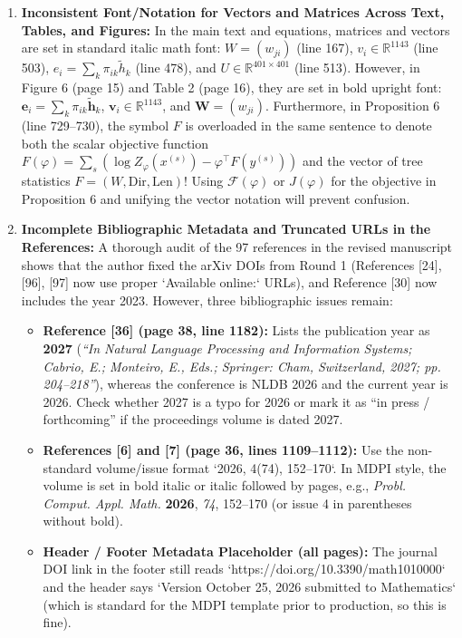 \documentclass[11pt,a4paper]{article}
\begin{document}
\begin{enumerate}[label=\textbf{Issue \arabic*:}, resume, wide, labelwidth=!, labelindent=0pt]
    \item \textbf{Inconsistent Font/Notation for Vectors and Matrices Across Text, Tables, and Figures:}
    In the main text and equations, matrices and vectors are set in standard italic math font: $W = (w_{ji})$ (line 167), $v_i \in \mathbb{R}^{1143}$ (line 503), $e_i = \sum_k \pi_{ik}\tilde{h}_k$ (line 478), and $U \in \mathbb{R}^{401\times 401}$ (line 513). However, in Figure 6 (page 15) and Table 2 (page 16), they are set in bold upright font: $\mathbf{e}_i = \sum_k \pi_{ik}\tilde{\mathbf{h}}_k$, $\mathbf{v}_i \in \mathbb{R}^{1143}$, and $\mathbf{W} = (w_{ji})$. Furthermore, in Proposition 6 (line 729--730), the symbol $F$ is overloaded in the same sentence to denote both the scalar objective function $F(\varphi) = \sum_s (\log Z_\varphi(x^{(s)}) - \varphi^\top F(y^{(s)}))$ and the vector of tree statistics $F = (W, \mathrm{Dir}, \mathrm{Len})$! Using $\mathcal{F}(\varphi)$ or $J(\varphi)$ for the objective in Proposition 6 and unifying the vector notation will prevent confusion.

    \item \textbf{Incomplete Bibliographic Metadata and Truncated URLs in the References:}
    A thorough audit of the 97 references in the revised manuscript shows that the author fixed the arXiv DOIs from Round 1 (References [24], [96], [97] now use proper `Available online:` URLs), and Reference [30] now includes the year 2023. However, three bibliographic issues remain:
    \begin{itemize}
        \item \textbf{Reference [36] (page 38, line 1182):} Lists the publication year as \textbf{2027} (\textit{``In Natural Language Processing and Information Systems; Cabrio, E.; Monteiro, E., Eds.; Springer: Cham, Switzerland, 2027; pp. 204--218''}), whereas the conference is NLDB 2026 and the current year is 2026. Check whether 2027 is a typo for 2026 or mark it as ``in press / forthcoming'' if the proceedings volume is dated 2027.
        \item \textbf{References [6] and [7] (page 36, lines 1109--1112):} Use the non-standard volume/issue format `2026, 4(74), 152--170`. In MDPI style, the volume is set in bold italic or italic followed by pages, e.g., \textit{Probl. Comput. Appl. Math.} \textbf{2026}, \textit{74}, 152--170 (or issue 4 in parentheses without bold).
        \item \textbf{Header / Footer Metadata Placeholder (all pages):} The journal DOI link in the footer still reads `https://doi.org/10.3390/math1010000` and the header says `Version October 25, 2026 submitted to Mathematics` (which is standard for the MDPI template prior to production, so this is fine).
    \end{itemize}


\end{enumerate}
\end{document}
